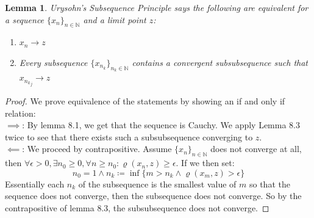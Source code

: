 \documentclass{article}
\newtheorem{lem}{Lemma}[section]
\begin{document}
\medskip
\begin{lem}
Urysohn's Subsequence Principle says the following are equivalent for a sequence $\{x_n\}_{n \in \mathbb{N}}$ and a limit point $z$:
\begin{enumerate}
    \item $x_n \xrightarrow{} z$
    \item Every subsequence $\{x_{n_k}\}_{n_k \in \mathbb{N}}$ contains a convergent subsubsequence such that $x_{{n_k}_j} \xrightarrow{} z$
\end{enumerate}
\end{lem}
\begin{proof} We prove equivalence of the statements by showing an if and only if relation:\\

$\implies$: By lemma 8.1, we get that the sequence is Cauchy. We apply Lemma 8.3 twice to see that there exists such a subsubsequence converging to $z$.\\

$\impliedby$: We proceed by contrapositive. Assume $\{x_n\}_{n \in \mathbb{N}}$ does not converge at all, then $\forall \epsilon > 0, \exists n_0 \geqslant 0, \forall n \geqslant n_0: \varrho(x_n, z) \geqslant \epsilon$. If we then set:
\begin{equation*}
    n_0 = 1 \land n_k \coloneq \inf\{m > n_k \land \varrho(x_m, z) > \epsilon\}
\end{equation*}
Essentially each $n_k$ of the subsequence is the smallest value of $m$ so that the sequence does not converge, then the subsequence does not converge. So by the contrapositive of lemma 8.3, the subsubsequence does not converge.
\end{proof}
\end{document}
